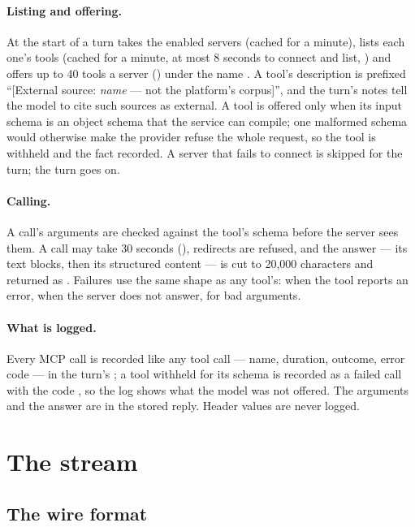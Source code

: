 \paragraph{Listing and offering.} At the start of a turn  takes the enabled
servers (cached for a minute), lists each one's tools (cached for a minute, at most 8 seconds
to connect and list, ) and offers up to 40 tools a server
() under the name . A tool's description is prefixed
\enquote{[External source: \emph{name} --- not the platform's corpus]}, and the turn's notes
tell the model to cite such sources as external. A tool is offered only when its input schema
is an object schema that the service can compile; one malformed schema would otherwise make the
provider refuse the whole request, so the tool is withheld and the fact recorded. A server that
fails to connect is skipped for the turn; the turn goes on.

\paragraph{Calling.} A call's arguments are checked against the tool's schema before the server
sees them. A call may take 30 seconds (), redirects are refused, and the
answer --- its text blocks, then its structured content --- is cut to 20,000 characters and
returned as . Failures use the same shape as any tool's:
 when the tool reports an error,  when the server
does not answer,  for bad arguments.

\paragraph{What is logged.} Every MCP call is recorded like any tool call --- name, duration,
outcome, error code --- in the turn's ; a tool withheld for its schema is
recorded as a failed call with the code , so the log shows what the
model was not offered. The arguments and the answer are in the stored reply. Header values are
never logged.


\section{The stream}\label{sec:chat:stream}

\subsection{The wire format}

